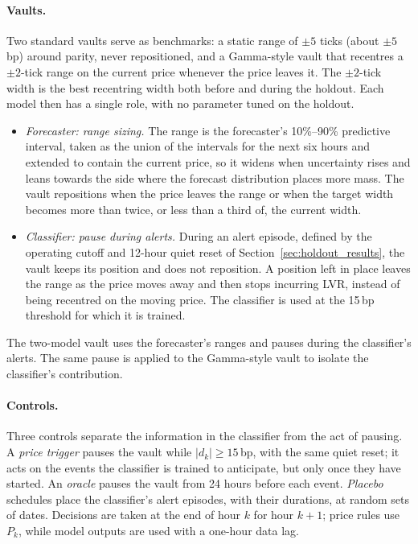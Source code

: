 \documentclass[a4paper,fleqn]{cas-sc}
\begin{document}
\paragraph{Vaults.} Two standard vaults serve as benchmarks: a static range of $\pm5$ ticks (about
$\pm5$\,bp) around parity, never repositioned, and a Gamma-style vault that recentres a $\pm2$-tick range on
the current price whenever the price leaves it. The $\pm2$-tick width is the best recentring width both
before and during the holdout. Each model then has a single role, with no parameter tuned on the holdout.
\begin{itemize}
  \item \emph{Forecaster: range sizing.} The range is the forecaster's 10\%--90\% predictive interval, taken
        as the union of the intervals for the next six hours and extended to contain the current price, so it
        widens when uncertainty rises and leans towards the side where the forecast distribution places more
        mass. The vault repositions when the price leaves the range or when the target width becomes more than
        twice, or less than a third of, the current width.
  \item \emph{Classifier: pause during alerts.} During an alert episode, defined by the operating cutoff
        and 12-hour quiet reset of Section~\ref{sec:holdout_results}, the vault keeps its position and does
        not reposition. A position left in place leaves the range as the price moves away and then stops
        incurring LVR, instead of being recentred on the moving price. The classifier is used at the 15\,bp
        threshold for which it is trained.
\end{itemize}
The two-model vault uses the forecaster's ranges and pauses during the classifier's alerts. The same pause
is applied to the Gamma-style vault to isolate the classifier's contribution.

\paragraph{Controls.} Three controls separate the information in the classifier from the act of pausing. A
\emph{price trigger} pauses the vault while $|d_k|\ge15$\,bp, with the same quiet reset; it acts on the
events the classifier is trained to anticipate, but only once they have started. An \emph{oracle} pauses the
vault from 24 hours before each event. \emph{Placebo} schedules place the classifier's \lpEpisodes{} alert
episodes, with their durations, at \lpNPlacebo{} random sets of dates. Decisions are taken at the end of hour
$k$ for hour $k+1$; price rules use $P_k$, while model outputs are used with a one-hour data lag.
\end{document}
